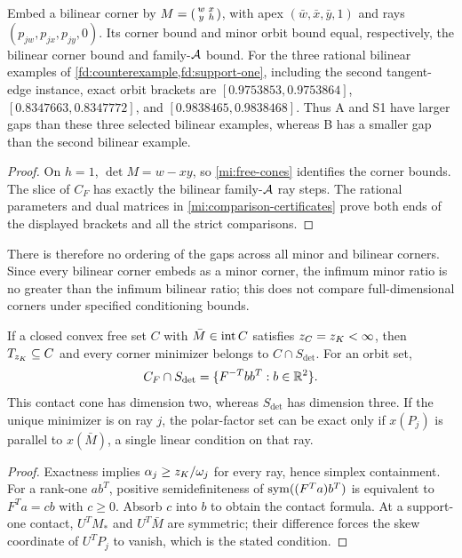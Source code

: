 \begin{corollary}\label{mi:embedding}
Embed a bilinear corner by
$M=\begin{psmallmatrix}w&x\\y&h\end{psmallmatrix}$,
with apex $(\bar w,\bar x,\bar y,1)$ and rays
$(p_{jw},p_{jx},p_{jy},0)$.
Its corner bound and minor orbit bound equal, respectively, the bilinear
corner bound and family-$\mathcal A$ bound.
For the three rational bilinear examples of
\cref{fd:counterexample,fd:support-one}, including the second tangent-edge
instance, exact orbit brackets are
$[0.9753853,0.9753864]$, $[0.8347663,0.8347772]$, and
$[0.9838465,0.9838468]$.
Thus A and S1 have larger gaps than these three selected bilinear examples,
whereas B has a smaller gap than the second bilinear example.
\end{corollary}
\begin{proof}
On $h=1$, $\det M=w-xy$, so \cref{mi:free-cones} identifies the corner
bounds. The slice of $C_F$ has exactly the bilinear family-$\mathcal A$ ray steps.
The rational parameters and dual matrices in
\cref{mi:comparison-certificates} prove both ends of the displayed brackets
and all the strict comparisons.
\end{proof}

There is therefore no ordering of the gaps across all minor and bilinear
corners. Since every bilinear corner embeds as a minor corner, the infimum
minor ratio is no greater than the infimum bilinear ratio; this does not
compare full-dimensional corners under specified conditioning bounds.

\begin{proposition}\label{mi:contact}
If a closed convex free set $C$ with $\bar M\in\operatorname{int} C$ satisfies
$z_C=z_K<\infty$, then $T_{z_K}\subseteq C$ and every corner minimizer
belongs to $C\cap S_{\det}$. For an orbit set,
\[
 C_F\cap S_{\det}=\{F^{-T}bb^T:b\in\mathbb R^2\}.
\]
This contact cone has dimension two, whereas $S_{\det}$ has dimension three.
If the unique minimizer is on ray $j$, the polar-factor set can be exact
only if $x(P_j)$ is parallel to $x(\bar M)$, a single linear condition
on that ray.
\end{proposition}
\begin{proof}
Exactness implies $\alpha_j\ge z_K/\omega_j$ for every ray, hence simplex
containment. For a rank-one $ab^T$, positive semidefiniteness of
$\operatorname{sym}((F^Ta)b^T)$ is equivalent to $F^Ta=cb$ with $c\ge0$.
Absorb $c$ into $b$ to obtain the contact formula.
At a support-one contact, $U^TM_*$ and $U^T\bar M$ are symmetric;
their difference forces the skew coordinate of $U^TP_j$ to vanish,
which is the stated condition.
\end{proof}

